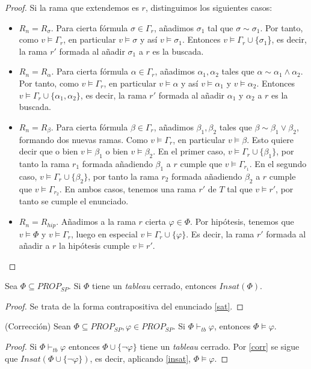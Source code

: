 \begin{proof}
Si la rama que extendemos es $r$, distinguimos los siguientes casos:
\begin{itemize}
    \item $R_n = R_\sigma$. Para cierta fórmula $\sigma \in \Gamma_r$, añadimos $\sigma_1$ tal que $\sigma \sim \sigma_1$. Por tanto, como $v \vDash \Gamma_r$, en particular $v \vDash \sigma$ y así $v \vDash \sigma_1$. Entonces $v \vDash \Gamma_r\cup \{\sigma_1$\}, es decir, la rama $r'$ formada al añadir $\sigma_1$ a $r$ es la buscada.
    \item $R_n = R_\alpha$. Para cierta fórmula $\alpha \in \Gamma_r$, añadimos $\alpha_1, \alpha_2$ tales que $\alpha \sim  \alpha_1 \land \alpha_2$. Por tanto, como $v \vDash \Gamma_r$, en particular $v \vDash \alpha$ y así $v \vDash \alpha_1$ y $v \vDash \alpha_2$. Entonces $v \vDash \Gamma_r\cup\{\alpha_1, \alpha_2\}$, es decir, la rama $r'$ formada al añadir $\alpha_1$ y $\alpha_2$ a $r$ es la buscada.
    \item $R_n = R_\beta$. Para cierta fórmula $\beta\in\Gamma_r$, añadimos  $\beta_1,\beta_2$ tales que $\beta \sim \beta_1\lor\beta_2$, formando dos nuevas ramas. Como $v\vDash\Gamma_r$, en particular $v \vDash\beta$. Esto quiere decir que o bien $v\vDash\beta_1$ o bien $v\vDash\beta_2$. En el primer caso, $v\vDash\Gamma_r\cup\{\beta_1\}$, por tanto la rama $r_1$ formada añadiendo $\beta_1$ a $r$ cumple que $v\vDash\Gamma_{r_1}$. En el segundo caso, $v\vDash\Gamma_r\cup\{\beta_2\}$, por tanto la rama $r_2$ formada añadiendo $\beta_2$ a $r$ cumple que $v\vDash\Gamma_{r_2}$. En ambos casos, tenemos una rama $r'$ de $T$ tal que $v\vDash r'$, por tanto se cumple el enunciado.
    \item $R_n = R_{hip}$. Añadimos a la rama $r$ cierta $\varphi \in \Phi$. Por hipótesis, tenemos que $v \vDash \Phi$ y $v \vDash \Gamma_r$, luego en especial $v \vDash \Gamma_r\cup\{\varphi\}$. Es decir, la rama $r'$ formada al añadir a $r$ la hipótesis cumple $v\vDash r'$.
\end{itemize}
\end{proof}

\begin{cor}\label{corr}
Sea $\Phi \subseteq PROP_{SP}$. Si $\Phi$ tiene un \textit{tableau} cerrado, entonces $Insat(\Phi)$.
\end{cor}
\begin{proof}
Se trata de la forma contrapositiva del enunciado \ref{sat}.
\end{proof}

\begin{cor}(Corrección)\label{corrección}
Sean $\Phi \subseteq PROP_{SP}, \varphi \in PROP_{SP}$. Si $\Phi \vdash_{tb} \varphi$, entonces $\Phi \vDash \varphi$.
\end{cor}
\begin{proof}
Si $\Phi \vdash_{tb} \varphi$ entonces $\Phi \cup \{\neg \varphi\}$ tiene un \textit{tableau} cerrado. Por \ref{corr} se sigue que $Insat(\Phi \cup \{\neg \varphi \})$, es decir,  aplicando \ref{insat}, $\Phi \vDash \varphi$.
\end{proof}

